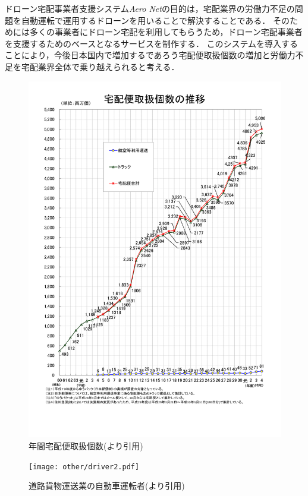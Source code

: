 \documentclass[a4paper, titlepage]{jsarticle}
\newcommand{\system}{\textsl{Aero Net}}
\begin{document}
ドローン宅配事業者支援システム\system の目的は，宅配業界の労働力不足の問題を自動運転で運用するドローンを用いることで解決することである．
そのためには多くの事業者にドローン宅配を利用してもらうため，ドローン宅配事業者を支援するためのベースとなるサービスを制作する．
このシステムを導入することにより，今後日本国内で増加するであろう宅配便取扱個数の増加と労働力不足を宅配業界全体で乗り越えられると考える．
\begin{figure}[H]
  \centering
  \includegraphics[height=0.8\textheight]{other/number.pdf}
  \caption{年間宅配便取扱個数(\cite{home_delivery_2022}より引用)}
  \label{fig:number}
\end{figure}
\begin{figure}[H]
  \centering
  \texttt{[image: other/driver2.pdf]}
  \caption{道路貨物運送業の自動車運転者(\cite{Human_Resource}より引用)}
  \label{fig:driver}
\end{figure}
\end{document}
